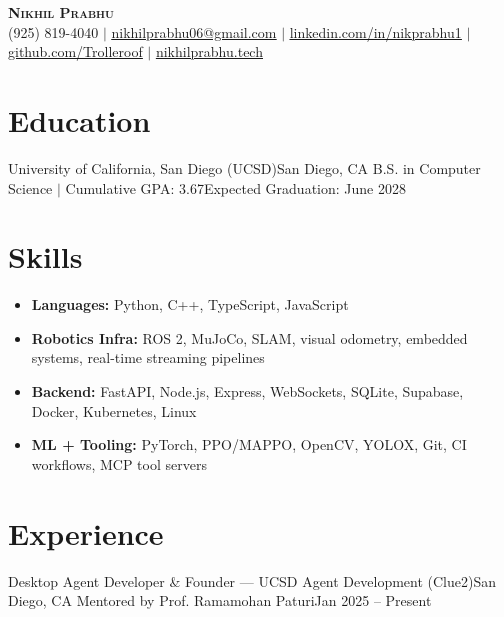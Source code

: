 




\begin{center}
    \textbf{\Large \scshape Nikhil Prabhu} \\ \vspace{1pt}
    \small (925) 819-4040 $|$ \href{mailto:nikhilprabhu06@gmail.com}{\underline{nikhilprabhu06@gmail.com}} $|$ 
    \href{https://www.linkedin.com/in/nikprabhu1/}{\underline{linkedin.com/in/nikprabhu1}} $|$
    \href{https://github.com/Trolleroof}{\underline{github.com/Trolleroof}} $|$
    \href{https://nikhilprabhu.tech}{\underline{nikhilprabhu.tech}}
\end{center}
\small

\section{Education}
  \resumeSubHeadingListStart
    \resumeSubheading
      {University of California, San Diego (UCSD)}{San Diego, CA}
      {B.S. in Computer Science $|$ Cumulative GPA: 3.67}{Expected Graduation: June 2028}
  \resumeSubHeadingListEnd
\vspace{-4pt}

\section{Skills}
\begin{itemize}[leftmargin=0.15in, label={}, nosep, topsep=2pt, itemsep=3pt, parsep=0pt]
  \item \textbf{Languages:} Python, C++, TypeScript, JavaScript
  \item \textbf{Robotics Infra:} ROS 2, MuJoCo, SLAM, visual odometry, embedded systems, real-time streaming pipelines
  \item \textbf{Backend:} FastAPI, Node.js, Express, WebSockets, SQLite, Supabase, Docker, Kubernetes, Linux
  \item \textbf{ML + Tooling:} PyTorch, PPO/MAPPO, OpenCV, YOLOX, Git, CI workflows, MCP tool servers
\end{itemize}
\vspace{-4pt}

\section{Experience}
  \resumeSubHeadingListStart

    \resumeSubheading
      {Desktop Agent Developer \& Founder --- UCSD Agent Development (Clue2)}{San Diego, CA}
      {Mentored by Prof. Ramamohan Paturi}{Jan 2025 -- Present}
      \resumeItemListStart
      \resumeItemListEnd

